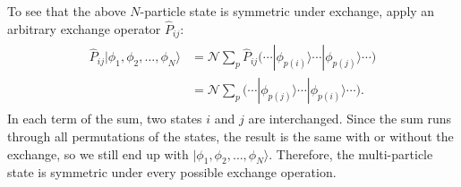 \documentclass[pra,12pt]{revtex4}
\begin{document}
To see that the above $N$-particle state is symmetric under exchange,
apply an arbitrary exchange operator $\hat{P}_{ij}$:
\begin{align}
  \begin{aligned}\hat{P}_{ij}|\phi_1,\phi_2,\dots,\phi_N\rangle &= \mathcal{N} \sum_p \hat{P}_{ij} \Big(\cdots  |\phi_{p(i)}\rangle  \cdots  |\phi_{p(j)}\rangle\cdots\Big) \\&= \mathcal{N} \sum_p \Big(\cdots  |\phi_{p(j)}\rangle  \cdots  |\phi_{p(i)}\rangle\cdots\Big).\end{aligned}
\end{align}
In each term of the sum, two states $i$ and $j$ are interchanged.
Since the sum runs through all permutations of the states, the result
is the same with or without the exchange, so we still end up with
$|\phi_1,\phi_2,\dots,\phi_N\rangle$.  Therefore, the multi-particle
state is symmetric under every possible exchange operation.
\end{document}
